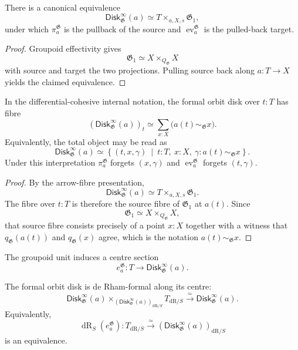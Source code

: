 \begin{proposition}
\label{prop:formal-disk-arrow-fibre}
There is a canonical equivalence
\[
    \mathsf{Disk}^{\infty}_{\mathfrak G}(a)
    \simeq
    T\times_{a,X,s}\mathfrak G_1,
\]
under which $\pi^{\mathfrak G}_a$ is the pullback of the source and
$\operatorname{ev}^{\mathfrak G}_a$ is the pulled-back target.
\end{proposition}

\begin{proof}
Groupoid effectivity gives
\[
    \mathfrak G_1
    \simeq
    X\times_{Q_{\mathfrak G}}X
\]
with source and target the two projections.  Pulling source back along
$a:T\to X$ yields the claimed equivalence.
\end{proof}


\begin{proposition}
\label{prop:formal-disk-dependent-presentation}
In the differential-cohesive internal notation, the formal orbit disk over
$t:T$ has fibre
\[
    \left(\mathsf{Disk}^{\infty}_{\mathfrak G}(a)\right)_t
    \simeq
    \sum_{x:X}
    \bigl(a(t)\sim_{\mathfrak G}x\bigr).
\]
Equivalently, the total object may be read as
\[
    \mathsf{Disk}^{\infty}_{\mathfrak G}(a)
    \simeq
    \left\{
        (t,x,\gamma)
        \ \middle|\
        t:T,\ x:X,\ \gamma:a(t)\sim_{\mathfrak G}x
    \right\}.
\]
Under this interpretation
$\pi^{\mathfrak G}_a$ forgets $(x,\gamma)$ and
$\operatorname{ev}^{\mathfrak G}_a$ forgets $(t,\gamma)$.
\end{proposition}

\begin{proof}
By the arrow-fibre presentation,
\[
    \mathsf{Disk}^{\infty}_{\mathfrak G}(a)
    \simeq
    T\times_{a,X,s}\mathfrak G_1.
\]
The fibre over $t:T$ is therefore the source fibre of $\mathfrak G_1$ at
$a(t)$.  Since
\[
    \mathfrak G_1\simeq X\times_{Q_{\mathfrak G}}X,
\]
that source fibre consists precisely of a point $x:X$ together with a
witness that $q_{\mathfrak G}(a(t))$ and $q_{\mathfrak G}(x)$ agree, which is
the notation $a(t)\sim_{\mathfrak G}x$.
\end{proof}

The groupoid unit induces a centre section
\[
    e^{\mathfrak G}_a:
    T\longrightarrow
    \mathsf{Disk}^{\infty}_{\mathfrak G}(a).
\]

\begin{proposition}
\label{prop:formal-disk-centre-formality}
The formal orbit disk is de Rham-formal along its centre:
\[
    \mathsf{Disk}^{\infty}_{\mathfrak G}(a)
    \times_{
        (\mathsf{Disk}^{\infty}_{\mathfrak G}(a))_{\mathrm{dR}/S}
    }
    T_{\mathrm{dR}/S}
    \xrightarrow{\simeq}
    \mathsf{Disk}^{\infty}_{\mathfrak G}(a).
\]
Equivalently,
\[
    \operatorname{dR}_S(e^{\mathfrak G}_a):
    T_{\mathrm{dR}/S}
    \xrightarrow{\simeq}
    (\mathsf{Disk}^{\infty}_{\mathfrak G}(a))_{\mathrm{dR}/S}
\]
is an equivalence.
\end{proposition}

